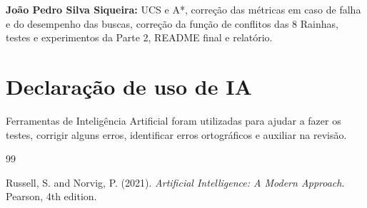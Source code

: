 \documentclass[12pt]{article}
\begin{document}
\noindent\textbf{João Pedro Silva Siqueira:} UCS e A*, correção das métricas em caso de falha e do desempenho das buscas, correção da função de conflitos das 8 Rainhas, testes e experimentos da Parte 2, README final e relatório.

\section*{Declaração de uso de IA}

Ferramentas de Inteligência Artificial foram utilizadas para ajudar a fazer os testes, corrigir alguns erros, identificar erros ortográficos e auxiliar na revisão.

\begin{thebibliography}{99}

Russell, S. and Norvig, P. (2021). \textit{Artificial Intelligence: A Modern Approach}. Pearson, 4th edition.

\end{thebibliography}
\end{document}
